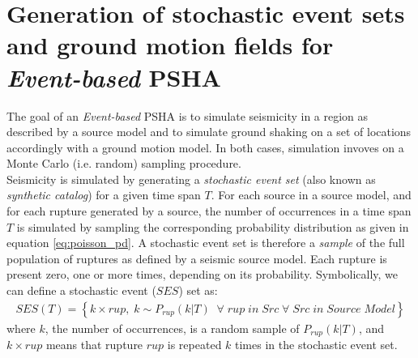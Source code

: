 \section[\textit{Event-based} PSHA]{Generation of stochastic event sets and ground motion fields for \textit{Event-based} PSHA}
The goal of an \textit{Event-based} PSHA is to simulate seismicity in a region as described by a source model
and to simulate ground shaking on a set of locations accordingly with a ground motion model. In both
cases, simulation invoves on a Monte Carlo (i.e. random) sampling procedure.\\
Seismicity is simulated by generating a \textit{stochastic event set} (also known as \textit{synthetic catalog})
for a given time span $T$. For each source in a source model, and for each rupture generated by a source,
the number of occurrences in a time span $T$ is simulated by sampling the corresponding probability
distribution as given in equation \ref{eq:poisson_pd}. A stochastic event set is therefore a \textit{sample}
of the full population of ruptures as defined by a seismic source model. Each rupture is present zero, one or
more times, depending on its probability. Symbolically, we can define a stochastic event ($SES$) set as:
\begin{align}
SES(T) = \left\{k \times rup,\;k\sim P_{rup}(k | T)\;\;\forall\;rup\;in\;Src\;\forall\;Src\;in\;Source\;Model\right\}
\end{align}
where $k$, the number of occurrences, is a random sample of $P_{rup}(k | T)$, and $k \times rup$ means
that rupture $rup$ is repeated $k$ times in the stochastic event set.

